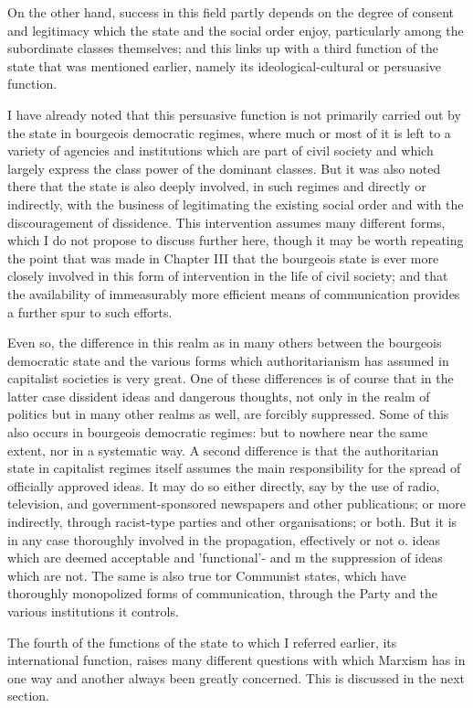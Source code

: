 On the other hand, success in this field partly depends on the degree of consent and legitimacy which the state and the social order enjoy, particularly among the subordinate classes themselves; and this links up with a third function of the state that was mentioned earlier, namely its ideological-cultural or persuasive function.

I have already noted that this persuasive function is not primarily carried out by the state in bourgeois democratic regimes, where much or most of it is left to a variety of agencies and institutions which are part of civil society and which largely express the class power of the dominant classes. But it was also noted there that the state is also deeply involved, in such regimes and directly or indirectly, with the business of legitimating the existing social order and with the discouragement of dissidence. This intervention assumes many different forms, which I do not propose to discuss further here, though it may be worth repeating the point that was made in Chapter III that the bourgeois state is ever more closely involved in this form of intervention in the life of civil society; and that the availability of immeasurably more efficient means of communication provides a further spur to such efforts.

Even so, the difference in this realm as in many others between the bourgeois democratic state and the various forms which authoritarianism has assumed in capitalist societies is very great. One of these differences is of course that in the latter case dissident ideas and dangerous thoughts, not only in the realm of politics but in many other realms as well, are forcibly suppressed. Some of this also occurs in bourgeois democratic regimes: but to nowhere near the same extent, nor in a systematic way. A second difference is that the authoritarian state in capitalist regimes itself assumes the main responsibility for the spread of officially approved ideas. It may do so either directly, say by the use of radio, television, and government-sponsored newspapers and other publications; or more indirectly, through racist\hyp{}type parties and other organisations; or both. But it is in any case thoroughly involved in the propagation, effectively or not o. ideas which are deemed acceptable and 'functional'- and m the suppression of ideas which are not. The same is also true tor Communist states, which have thoroughly monopolized forms of communication, through the Party and the various institutions it controls.

The fourth of the functions of the state to which I referred earlier, its international function, raises many different questions with which Marxism has in one way and another always been greatly concerned. This is discussed in the next section.


